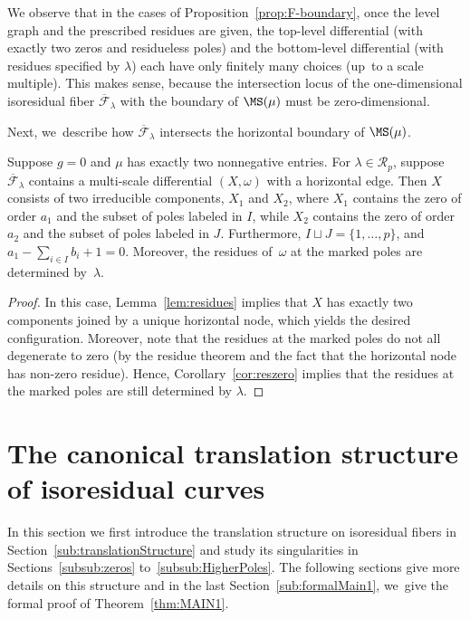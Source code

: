\begin{rmk}
We observe that in the cases of Proposition~\ref{prop:F-boundary}, once the level graph and the prescribed residues are given, the top-level differential (with exactly two zeros and residueless poles) and the bottom-level differential (with residues specified by $\lambda$) each have only finitely many choices (up~to a scale multiple). This makes sense, because the intersection locus of the one-dimensional isoresidual fiber $\overline{\mathcal F}_\lambda$ with the boundary of $\MS(\mu)$ must be zero-dimensional.
\end{rmk}

Next, we~describe how $\overline{\mathcal F}_\lambda$ intersects the horizontal boundary of $\MS(\mu)$.

\begin{prop}\label{prop:F-horizontal}
Suppose $g=0$ and $\mu$ has exactly two nonnegative entries.
For $\lambda \in \mathcal{R}_{p}$,
suppose $\overline{\mathcal F}_\lambda$ contains a multi-scale differential $(X,\omega)$ with a horizontal edge. Then $X$ consists of two irreducible components, $X_1$ and $X_2$, where $X_1$ contains the zero of order $a_1$ and the subset of poles labeled in $I$, while $X_2$ contains the zero of order $a_2$ and the subset of poles labeled in $J$. Furthermore, $I\sqcup J = \{1,\ldots,p\}$, and $a_1 - \sum_{i \in I} b_i + 1 = 0$. Moreover, the residues of~$\omega$ at the marked poles are determined by~$\lambda$.
\end{prop}

\begin{proof}
In this case, Lemma~\ref{lem:residues} implies that $X$ has exactly two components joined by a unique horizontal node, which yields the desired configuration. Moreover, note that the residues at the marked poles do not all degenerate to zero (by the residue theorem and the fact that the horizontal node has non-zero residue). Hence, Corollary~\ref{cor:reszero} implies that the residues at the marked poles are still determined by $\lambda$.
\end{proof}

\section{The canonical translation structure of isoresidual curves}\label{sec:Translation}

In this section we first introduce the translation structure on isoresidual fibers in Section~\ref{sub:translationStructure} and study its singularities in Sections~\ref{subsub:zeros} to~\ref{subsub:HigherPoles}. The following sections give more details on this structure and in the last Section~\ref{sub:formalMain1}, we~give the formal proof of Theorem~\ref{thm:MAIN1}.

